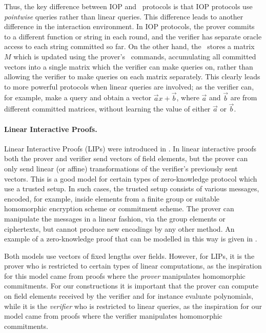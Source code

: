 Thus, the key difference between IOP and \ILC\ protocols is that IOP protocols use \emph{pointwise} queries rather than linear queries. This difference leads to another difference in the interaction environment. In IOP protocols, the prover commits to a different function or string in each round, and the verifier has separate oracle access to each string committed so far. On the other hand, the \ILC\ stores a matrix $M$ which is updated using the prover's \ILCcommit\ commands, accumulating all committed vectors into a single matrix which the verifier can make queries on, rather than allowing the verifier to make queries on each matrix separately. This clearly leads to more powerful protocols when linear queries are involved; as the verifier can, for example, make a query and obtain a vector $\vec{a}x+\vec{b}$, where $\vec{a}$ and $\vec{b}$ are from different committed matrices, without learning the value of either $\vec{a}$ or $\vec{b}$.

\paragraph{Linear Interactive Proofs.} Linear Interactive Proofs  (LIPs) were introduced in \cite{BitanskyCIPO13}. In linear interactive proofs both the prover and verifier send vectors of field elements, but the prover can only send linear (or affine) transformations of the verifier's previously sent vectors. This is a good model for certain types of zero-knowledge protocol which use a trusted setup. In such cases, the trusted setup consists of various messages, encoded, for example, inside elements from a finite group or suitable homomorphic encryption scheme or commitment scheme. The prover can manipulate the messages in a linear fashion, via the group elements or ciphertexts, but cannot produce new encodings by any other method. An example of a zero-knowledge proof that can be modelled in this way is given in \cite{Gennaro2013}.

Both models use vectors of fixed lengths over fields. However, for LIPs, it is the prover who is restricted to certain types of linear computations, as the inspiration for this model came from proofs where the \emph{prover} manipulates homomorphic commitments. For our constructions it is important that the prover can compute on field elements received by the verifier and for instance evaluate polynomials, while it is the \emph{verifier} who is restricted to linear queries, as the inspiration for our model came from proofs where the verifier manipulates homomorphic commitments.

